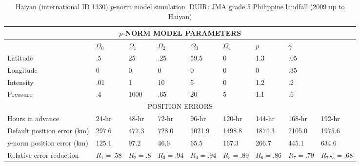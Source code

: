 \documentclass{SBCbookchapter}
\begin{document}
\begin{minipage}[r]{4.25in}
{    \begin{table}[h]
\centering
\tiny
\begin{tabular}{|l|l|l|l|l|l|l|l|l|}
\multicolumn{9}{c}{$p$-NORM MODEL PARAMETERS }\\\hline
&$\Omega_0$ & $\Omega_1$ & $\Omega_2$ & $\Omega_3$ & $\Omega_4$ & $p$ &\multicolumn{2}{l|}{$\gamma$}\\\hline
Latitude &  .5 & 25 & .25 & 59.5 & 0 & 1.3 & \multicolumn{2}{l|}{.05} \\
Longitude &  0 & 0 & 0 & 0 & 0 & 0 & \multicolumn{2}{l|}{.35} \\
Intensity &  .01 & 1 & 10 & 5 & 0 & 1.2 & \multicolumn{2}{l|}{.2} \\
Pressure & .4 &1000&.65&20&5&1.1&\multicolumn{2}{l|}{.6} \\ \hline \hline
\multicolumn{9}{|c|}{POSITION ERRORS }\\\hline
  Hours in advance    & 24-hr & 48-hr &72-hr &96-hr & 120-hr & 144-hr & 168-hr& 192-hr\\\hline
  Default position error  (km)  &297.6  &477.3 & 728.0&1021.9 & 1498.8 &1874.3  & 2105.0 &  1975.6 \\\hline
  $p$-norm position error  (km)   &  125.1  &  97.2  & 46.6  & 65.5  & 167.3& 266.7  &  445.1&   634.6   \\\hline
  Relative error reduction & $R_1=.58 $  &$R_2=.8 $ &$R_3=.94 $ &$R_4=.94 $ &$R_5=.89 $ &$R_6=.86 $  &$R_7=.79 $ &  $R_{7.75} =.68 $   \\ \hline
 \end{tabular}
  \caption{Haiyan (international ID 1330) $p$-norm model simulation. DUIR: JMA grade 5 Philippine landfall (2009 up to Haiyan) }
  \label{typ2}
\end{table}

}
\end{minipage}
\end{document}
